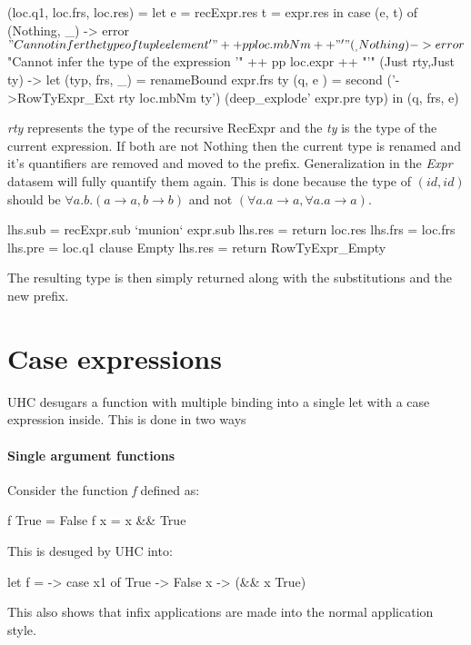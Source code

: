 \begin{code}    
   (loc.q1, loc.frs, loc.res)
     = let e = recExpr.res
           t = expr.res
       in case (e, t) of
            (Nothing, _) -> error $ "Cannot infer the type of tuple element '" ++ pp loc.mbNm ++ "'"
            (_, Nothing) -> error $ "Cannot infer the type of the expression '" ++ pp loc.expr ++ "'"
            (Just rty,Just ty) -> let (typ, frs, _) = renameBound expr.frs ty 
                                      (q,   e     ) = second (\ty'->RowTyExpr_Ext rty loc.mbNm ty') (deep_explode' expr.pre typ)
                                  in (q, frs, e)
\end{code}
\emph{rty} represents the type of the recursive RecExpr and the \emph{ty} is the type of the current expression. If both are not Nothing then the current type is renamed and it's quantifiers are removed and moved to the prefix. Generalization in the \emph{Expr} datasem will fully quantify them again. This is done because the type of $(id, id)$ should be $\forall a. b. (a \rightarrow a, b \rightarrow b)$ and not $(\forall a. a \rightarrow a, \forall a. a \rightarrow a)$.

\begin{code}                              
      lhs.sub = recExpr.sub `munion` expr.sub
      lhs.res = return loc.res
      lhs.frs = loc.frs
      lhs.pre = loc.q1
   clause Empty
      lhs.res = return RowTyExpr_Empty
\end{code}
The resulting type is then simply returned along with the substitutions and the new prefix. 

\section{Case expressions}
UHC desugars a function with multiple binding into a single let with a case expression inside. This is done in two ways
\paragraph{Single argument functions}
Consider the function \emph{f} defined as:
\begin{code}
f True = False
f x    = x && True
\end{code}
This is desuged by UHC into:
\begin{code}
let f =  -> case x1 of
                 True -> False
                 x -> (&& x True)
\end{code}
This also shows that infix applications are made into the normal application style.

